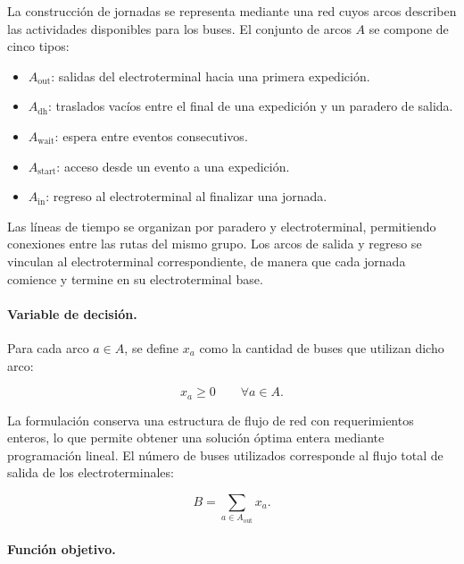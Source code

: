 La construcción de jornadas se representa mediante una red cuyos arcos
describen las actividades disponibles para los buses. El conjunto de
arcos $A$ se compone de cinco tipos:

\begin{itemize}
    \item $A_{\mathrm{out}}$: salidas del electroterminal hacia una
    primera expedición.

    \item $A_{\mathrm{dh}}$: traslados vacíos entre el final de una
    expedición y un paradero de salida.

    \item $A_{\mathrm{wait}}$: espera entre eventos consecutivos.

    \item $A_{\mathrm{start}}$: acceso desde un evento a una expedición.

    \item $A_{\mathrm{in}}$: regreso al electroterminal al finalizar
    una jornada.
\end{itemize}

Las líneas de tiempo se organizan por paradero y electroterminal,
permitiendo conexiones entre las rutas del mismo grupo. Los arcos
de salida y regreso se vinculan al electroterminal correspondiente,
de manera que cada jornada comience y termine en su electroterminal base.

\paragraph{Variable de decisión.}

Para cada arco $a \in A$, se define $x_a$ como la cantidad de buses
que utilizan dicho arco:

\begin{equation}
    x_a \geq 0
    \qquad \forall a \in A.
\end{equation}

La formulación conserva una estructura de flujo de red con requerimientos
enteros, lo que permite obtener una solución óptima entera mediante
programación lineal. El número de buses utilizados corresponde al flujo
total de salida de los electroterminales:

\begin{equation}
    B = \sum_{a \in A_{\mathrm{out}}} x_a.
\end{equation}

\paragraph{Función objetivo.}

